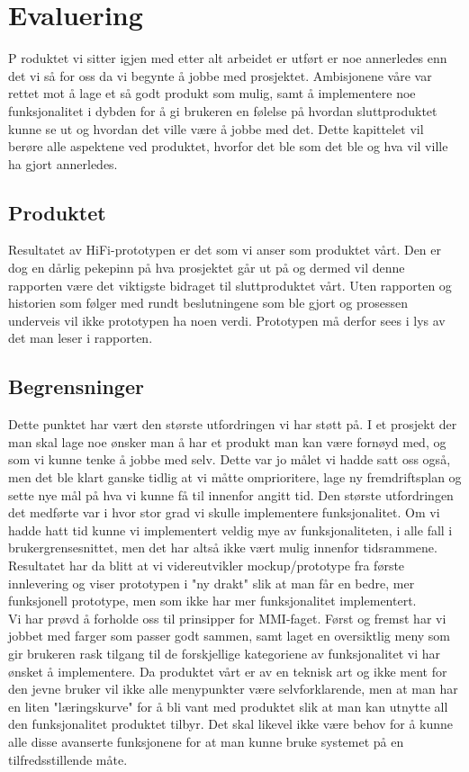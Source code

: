 \chapter{Evaluering}
\lettrine[lines=2]{P}{} roduktet vi sitter igjen med etter alt arbeidet er utført er noe annerledes enn det vi så for oss da vi begynte å jobbe med prosjektet. Ambisjonene våre var rettet mot å lage et så godt produkt som mulig, samt å implementere noe funksjonalitet i dybden for å gi brukeren en følelse på hvordan sluttproduktet kunne se ut og hvordan det ville være å jobbe med det. Dette kapittelet vil berøre alle aspektene ved produktet, hvorfor det ble som det ble og hva vil ville ha gjort annerledes.

\section{Produktet}
Resultatet av HiFi-prototypen er det som vi anser som produktet vårt. Den er dog en dårlig pekepinn på hva prosjektet går ut på og dermed vil denne rapporten være det viktigste bidraget til sluttproduktet vårt. Uten rapporten og historien som følger med rundt beslutningene som ble gjort og prosessen underveis vil ikke prototypen ha noen verdi. Prototypen må derfor sees i lys av det man leser i rapporten.


\section{Begrensninger} \label{sec:begrensninger}
Dette punktet har vært den største utfordringen vi har støtt på. I et prosjekt der man skal lage noe ønsker man å har et produkt man kan være fornøyd med, og som vi kunne tenke å jobbe med selv. Dette var jo målet vi hadde satt oss også, men det ble klart ganske tidlig at vi måtte omprioritere, lage ny fremdriftsplan og sette nye mål på hva vi kunne få til innenfor angitt tid.
Den største utfordringen det medførte var i hvor stor grad vi skulle implementere funksjonalitet. Om vi hadde hatt tid kunne vi implementert veldig mye av funksjonaliteten, i alle fall i brukergrensesnittet, men det har altså ikke vært mulig innenfor tidsrammene.
Resultatet har da blitt at vi videreutvikler mockup/prototype fra første innlevering og viser prototypen i "ny drakt" slik at man får en bedre, mer funksjonell prototype, men som ikke har mer funksjonalitet implementert.\\
Vi har prøvd å forholde oss til prinsipper for MMI-faget. Først og fremst har vi jobbet med farger som passer godt sammen, samt laget en oversiktlig meny som gir brukeren rask tilgang til de forskjellige kategoriene av funksjonalitet vi har ønsket å implementere.
Da produktet vårt er av en teknisk art og ikke ment for den jevne bruker vil ikke alle menypunkter være selvforklarende, men at man har en liten "læringskurve" for å bli vant med produktet slik at man kan utnytte all den funksjonalitet produktet tilbyr.
Det skal likevel ikke være behov for å kunne alle disse avanserte funksjonene for at man kunne bruke systemet på en tilfredsstillende måte.


